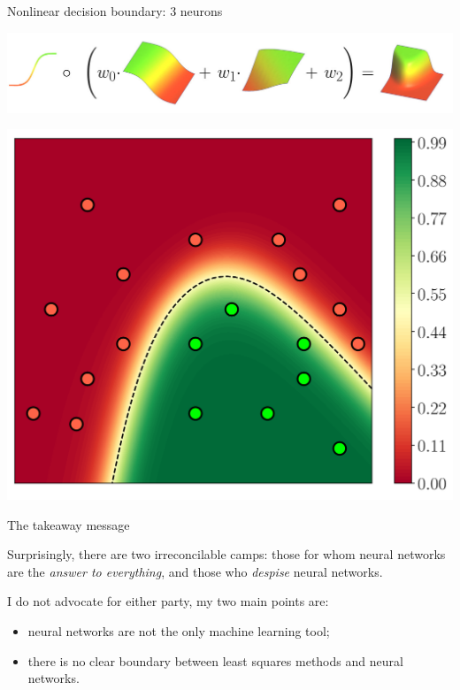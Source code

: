 \documentclass[UKenglish,aspectratio=169]{beamer}
\begin{document}
\begin{frame}
\inputminted[frame=single]{python}{listings/neural.py}
\end{frame}


\begin{frame}{Nonlinear decision boundary: 3 neurons}
\centerline{\includegraphics[width=.9\linewidth]{../manuscript/img/3n.jpg}}
\pause
\centerline{\includegraphics[width=.38\linewidth]{../manuscript/img/neural.png}}
\end{frame}

\begin{frame}{The takeaway message}
\vspace{2ex}

Surprisingly, there are two irreconcilable camps: those for whom neural networks are the \textit{answer to everything}, and those who \textit{despise} neural networks.


\vspace{2ex}
I do not advocate for either party, my two main points are:

\vspace{2ex}
\begin{itemize}
\item neural networks are not the only machine learning tool;
\item there is no clear boundary between least squares methods and neural networks.
\end{itemize}
\end{frame}
\end{document}
